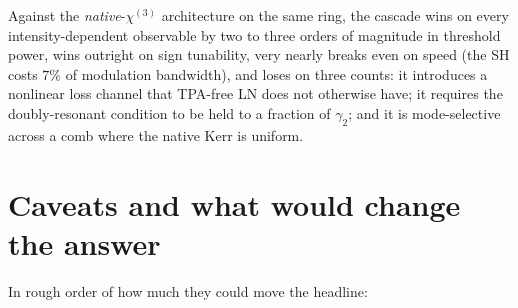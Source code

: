 \documentclass[11pt,a4paper]{article}
\newcommand{\chithree}{\chi^{(3)}}
\begin{document}
Against the \emph{native}-$\chithree$ architecture on the same ring, the
cascade wins on every intensity-dependent observable by two to three
orders of magnitude in threshold power, wins outright on sign
tunability, very nearly breaks even on speed (the SH costs $7\%$ of
modulation bandwidth), and loses on three counts: it introduces a nonlinear loss channel that TPA-free LN
does not otherwise have; it requires the doubly-resonant condition to be
held to a fraction of $\gamma_2$; and it is mode-selective across a comb
where the native Kerr is uniform.

\section{Caveats and what would change the answer}\label{sec:caveats}

In rough order of how much they could move the headline:
\end{document}
